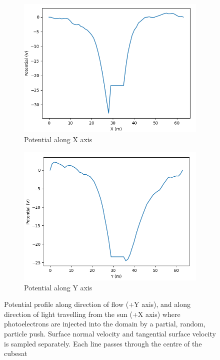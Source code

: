 \begin{figure}[H]
  \begin{subfigure}[b]{0.6\textwidth}
    \includegraphics[width=\textwidth]{figures/DECA/PhotoelectronInjectionByDoubleGauss/potentialAlongX.PNG}
    \caption{Potential along X axis}
    \label{fig:DoubleGaussAlongX}
  \end{subfigure}
  \begin{subfigure}[b]{0.6\textwidth}
    \includegraphics[width=\textwidth]{figures/DECA/PhotoelectronInjectionByDoubleGauss/potentialAlongY.PNG}
    \caption{Potential along Y axis}
    \label{fig:DoubleGaussAlongY}
  \end{subfigure}
  \label{fig:DoubleGaussAlong}
  \caption{Potential profile along direction of flow (+Y axis), and along direction of light travelling from the sun (+X axis) where photoelectrons are injected into the domain by a partial, random, particle push. Surface normal velocity and tangential surface velocity is sampled separately. Each line passes through the centre of the cubesat}
\end{figure}


